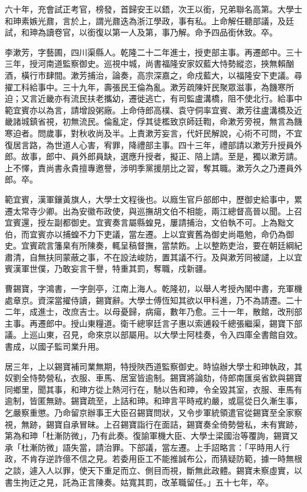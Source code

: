 \begin{pinyinscope}
六十年，充會試正考官，榜發，首歸安王以鋙，次王以銜，兄弟聯名高第。大學士和珅素嫉光鼐，言於上，謂光鼐迭為浙江學政，事有私。上命解任聽部議，及廷試，和珅為讀卷官，以銜復以第一人及第，事乃解。命予四品銜休致。卒。

李漱芳，字藝圃，四川渠縣人。乾隆二十二年進士，授吏部主事。再遷郎中。三十三年，授河南道監察御史。巡視中城，尚書福隆安家奴藍大恃勢縱恣，挾無賴酗酒，橫行市肆間。漱芳捕治，論奏，高宗深嘉之，命戍藍大，以福隆安下吏議。尋擢工科給事中。三十九年，壽張民王倫為亂。漱芳疏陳奸民聚眾滋事，為饑寒所迫；又言近畿亦有流民扶老攜幼，遷徙逃亡，有司監盧溝橋，阻不使北行。給事中範宜賓亦以為言，請增設粥廠。上命侍郎高樸、袁守侗率宜賓、漱芳往盧溝橋及近畿諸城鎮省視，初無流民。倫亂定，俘其徒檻致京師廷鞫，命漱芳旁視，無言為饑寒迫者。問歲事，對秋收尚及半。上責漱芳妄言，代奸民解說，心術不可問，不宜復居言路，為世道人心害，宥罪，降禮部主事。四十三年，禮部請以漱芳升授員外郎。故事，郎中、員外郎員缺，選應升授者，擬正、陪上請。至是，獨以漱芳請。上不懌，責尚書永貴擅專邀譽，涉明季黨援朋比之習，奪其職。漱芳久之乃遷員外郎。卒。

範宜賓，漢軍鑲黃旗人，大學士文程後也。以廕生官戶部郎中，歷御史給事中，累遷太常寺少卿。出為安徽布政使，與巡撫胡文伯不相能，兩江總督高晉以聞。上召宜賓還，授左副都御史。宜賓奏言屬縣蝗見，屢請捕治，文伯執不可。上為黜文伯，而宜賓亦以捕蝗不力下吏議，當左遷。上以宜賓舊為御史尚黽勉，命仍為御史。宜賓疏言籓臬有所陳奏，輒呈稿督撫，當禁飭。上以整飭吏治，要在朝廷綱紀肅清，自無扶同蒙蔽之事，不在設法峻防，置其議不行。及與漱芳同被譴，上以宜賓漢軍世僕，乃敢妄言干譽，特重其罰，奪職，戍新疆。

曹錫寶，字鴻書，一字劍亭，江南上海人。乾隆初，以舉人考授內閣中書，充軍機處章京。資深當擢侍讀，錫寶辭。大學士傅恆知其欲以甲科進，乃不為請遷。二十二年，成進士，改庶吉士。以母憂歸，病瘍，數年乃愈。三十一年，散館，改刑部主事。再遷郎中。授山東糧道。衛千總寧廷言子惠以索逋殺千總張繼渠，錫寶下部議。上巡山東，召見，命來京以部屬用。以大學士阿桂奏，令入四庫全書館自效。書成，以國子監司業升用。

居三年，上以錫寶補司業無期，特授陜西道監察御史。時協辦大學士和珅執政，其奴劉全恃勢營私，衣服、車馬、居室皆逾制。錫寶將論劾，侍郎南匯吳省欽與錫寶同鄉里，聞其事，和珅方從上熱河行在，馳以告和珅，令全毀其室，衣服、車馬有逾制，皆匿無跡。錫寶疏至，上詰和珅。和珅言平時戒約嚴，或扈從日久漸生事，乞嚴察重懲。乃命留京辦事王大臣召錫寶問狀，又令步軍統領遣官從錫寶至全家察視，無跡，錫寶自承冒昧。上召錫寶詣行在面詰，錫寶奏全倚勢營私，未有實跡，第為和珅「杜漸防微」，乃有此奏。復諭軍機大臣、大學士梁國治等覆詢，錫寶又承「杜漸防微」語失當，請治罪。下部議，當左遷。上手詔略言：「平時用人行政，不肯存逆詐億不信之見。若委用臣工不能推誠布公，而猜疑防範，據一時無根之談，遽入人以罪，使天下重足而立、側目而視，斷無此政體。錫寶未察虛實，以書生拘迂之見，託為正言陳奏。姑寬其罰，改革職留任。」五十七年，卒。


\end{pinyinscope}
